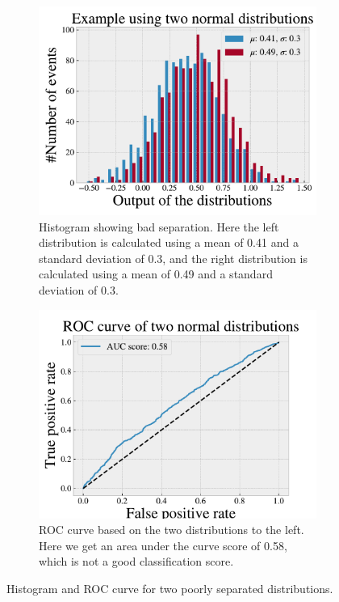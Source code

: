 \begin{figure}[h!]
    \centering
    \begin{subfigure}{.45\textwidth}
        \includegraphics[width=\textwidth]{Figures/Machinelearning/histo_example_bad.pdf}
        \caption{Histogram showing bad separation. Here the left distribution is calculated using a mean of 0.41 and a standard 
        deviation of 0.3, and the right distribution is calculated using a mean of 0.49 and a standard deviation of 0.3.}
        \label{fig:dist_ex_bad}
    \end{subfigure}
    \hfill
    \begin{subfigure}{.45\textwidth}
        \includegraphics[width=\textwidth]{Figures/Machinelearning/ROC_curve_example_bad.pdf}
        \caption{ROC curve based on the two distributions to the left. Here we get an area under the curve score of 0.58, which is not a good classification score.}
        \label{fig:ROC_curve_ex_bad}
    \end{subfigure}
    \hfill        
    \caption{Histogram and ROC curve for two poorly separated distributions.}
    \label{fig:roc_example_bad}
\end{figure}

